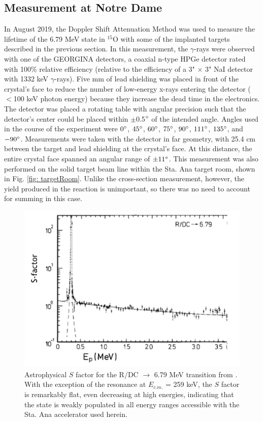 \subsection{Measurement at Notre Dame}
\label{sec: lifetimeND}

In August 2019, the Doppler Shift Attenuation Method was used to measure the lifetime of the 6.79 MeV state in $^{15}$O with some of the implanted targets described in the previous section. In this measurement, the $\gamma$-rays were observed with one of the GEORGINA detectors, a coaxial n-type HPGe detector rated with 100\% relative efficiency (relative to the efficiency of a 3" $\times$ 3" NaI detector with 1332 keV $\gamma$-rays). Five mm of lead shielding was placed in front of the crystal's face to reduce the number of low-energy x-rays entering the detector ($<$100 keV photon energy) because they increase the dead time in the electronics. The detector was placed a rotating table with angular precision such that the detector's center could be placed within $\pm$0.5$\degree$ of the intended angle. Angles used in the course of the experiment were $0\degree$, $45\degree$, $60\degree$, $75\degree$, $90\degree$, $111\degree$, $135\degree$, and $-90\degree$. Measurements were taken with the detector in far geometry, with 25.4 cm between the target and lead shielding at the crystal's face. At this distance, the entire crystal face spanned an angular range of $\pm11\degree$. This measurement was also performed on the solid target beam line within the Sta. Ana target room, shown in Fig. \ref{fig: targetRoom}. Unlike the cross-section measurement, however, the yield produced in the reaction is unimportant, so there was no need to account for summing in this case. 

\begin{figure}
\centering
\includegraphics[width=0.7\linewidth]{figures/schroderSfac.png}
\caption{Astrophysical $S$ factor for the R/DC $\rightarrow$ 6.79 MeV transition from \cite{Schroder1987}. With the exception of the resonance at $E_{c.m.}$ = 259 keV, the $S$ factor is remarkably flat, even decreasing at high energies, indicating that the state is weakly populated in all energy ranges accessible with the Sta. Ana accelerator used herein. }
\label{fig: schroderSfac}
\end{figure}


